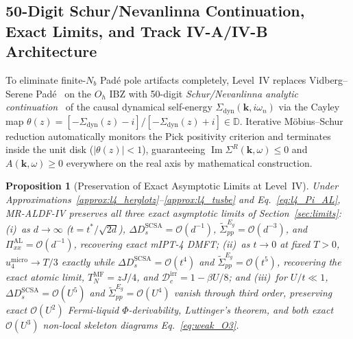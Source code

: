 \documentclass[11pt,a4paper]{article}
\numberwithin{equation}{section}
\theoremstyle{plain}
\newtheorem{proposition}{Proposition}[section]
\theoremstyle{definition}
\providecommand{\vk}{\mathbf{k}}
\providecommand{\im}{\operatorname{Im}}
\begin{document}
\subsection{50-Digit Schur/Nevanlinna Continuation, Exact Limits, and Track IV-A/IV-B Architecture}
\label{sec:l4_nevanlinna}

To eliminate finite-$N_b$ Pad\'e pole artifacts completely, Level~IV replaces
Vidberg--Serene Pad\'e~\cite{Vidberg1977} on the $O_h$ IBZ with 50-digit
\emph{Schur/Nevanlinna analytic continuation}~\cite{Fei2021} of the causal dynamical
self-energy $\Sigma_{\mathrm{dyn}}(\vk, i\omega_n)$ via the Cayley map
$\theta(z) = [-\Sigma_{\mathrm{dyn}}(z) - i]/[-\Sigma_{\mathrm{dyn}}(z) + i] \in \mathbb{D}$.
Iterative M\"obius--Schur reduction automatically monitors the Pick positivity criterion
and terminates inside the unit disk ($|\theta(z)| < 1$), guaranteeing
$\im\Sigma^R(\vk, \omega) \le 0$ and $A(\vk, \omega) \ge 0$ everywhere on the real axis
by mathematical construction.

\begin{proposition}[Preservation of Exact Asymptotic Limits at Level~IV]
\label{prop:l4_limits}
Under Approximations~\ref{approx:l4_herglotz}--\ref{approx:l4_tusbe} and
Eq.~\eqref{eq:l4_Pi_AL}, MR-ALDF-IV preserves all three exact asymptotic limits of
Section~\ref{sec:limits}:
(i)~as $d \to \infty$ ($t = t^*/\sqrt{2d}$), $\Delta D_s^{\mathrm{SCSA}} = \mathcal{O}(d^{-1})$,
$\tilde{\Sigma}_{pp}^{E_g} = \mathcal{O}(d^{-3})$, and $\Pi_{xx}^{\mathrm{AL}} = \mathcal{O}(d^{-1})$,
recovering exact mIPT-4 DMFT;
(ii)~as $t \to 0$ at fixed $T > 0$, $u_4^{\mathrm{micro}} \to T/3$ exactly while
$\Delta D_s^{\mathrm{SCSA}} = \mathcal{O}(t^4)$ and $\tilde{\Sigma}_{pp}^{E_g} = \mathcal{O}(t^5)$,
recovering the exact atomic limit, $T_N^{\mathrm{MF}} = zJ/4$, and $\mathcal{D}_c^{\mathrm{irr}} = 1 - \beta U/8$; and
(iii)~for $U/t \ll 1$, $\Delta D_s^{\mathrm{SCSA}} = \mathcal{O}(U^5)$ and
$\tilde{\Sigma}_{pp}^{E_g} = \mathcal{O}(U^4)$ vanish through third order, preserving exact
$\mathcal{O}(U^2)$ Fermi-liquid $\Phi$-derivability, Luttinger's theorem, and both exact
$\mathcal{O}(U^3)$ non-local skeleton diagrams Eq.~\eqref{eq:weak_O3}.
\end{proposition}
\end{document}
